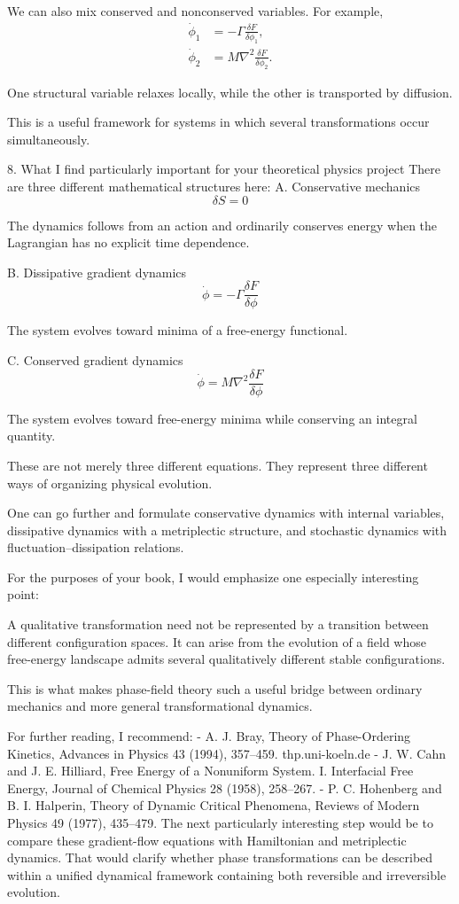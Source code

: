 We can also mix conserved and nonconserved variables. For example,
\[
\begin{aligned}
\dot\phi_1&=-\Gamma\frac{\delta F}{\delta\phi_1},\\
\dot\phi_2&=M\nabla^2\frac{\delta F}{\delta\phi_2}.
\end{aligned}
\]

One structural variable relaxes locally, while the other is transported by diffusion.

This is a useful framework for systems in which several transformations occur simultaneously.

8. What I find particularly important for your theoretical physics project
There are three different mathematical structures here:
A. Conservative mechanics
\[
\delta S=0
\]

The dynamics follows from an action and ordinarily conserves energy when the Lagrangian has no explicit time dependence.

B. Dissipative gradient dynamics
\[
\dot\phi=-\Gamma\frac{\delta F}{\delta\phi}
\]

The system evolves toward minima of a free-energy functional.

C. Conserved gradient dynamics
\[
\dot\phi=M\nabla^2\frac{\delta F}{\delta\phi}
\]

The system evolves toward free-energy minima while conserving an integral quantity.

These are not merely three different equations. They represent three different ways of organizing physical evolution.

One can go further and formulate conservative dynamics with internal variables, dissipative dynamics with a metriplectic structure, and stochastic dynamics with fluctuation–dissipation relations.

For the purposes of your book, I would emphasize one especially interesting point:

A qualitative transformation need not be represented by a transition between different configuration spaces. It can arise from the evolution of a field whose free-energy landscape admits several qualitatively different stable configurations.

This is what makes phase-field theory such a useful bridge between ordinary mechanics and more general transformational dynamics.

For further reading, I recommend:
- A. J. Bray, Theory of Phase-Ordering Kinetics, Advances in Physics 43 (1994), 357–459. 
  thp.uni-koeln.de
- J. W. Cahn and J. E. Hilliard, Free Energy of a Nonuniform System. I. Interfacial Free Energy, Journal of Chemical Physics 28 (1958), 258–267.
- P. C. Hohenberg and B. I. Halperin, Theory of Dynamic Critical Phenomena, Reviews of Modern Physics 49 (1977), 435–479.
The next particularly interesting step would be to compare these gradient-flow equations with Hamiltonian and metriplectic dynamics. That would clarify whether phase transformations can be described within a unified dynamical framework containing both reversible and irreversible evolution.

